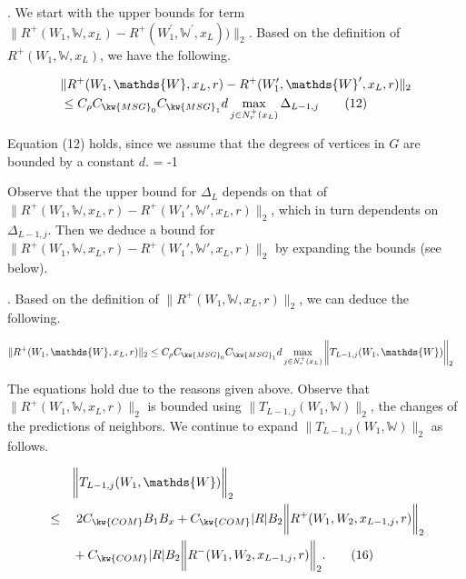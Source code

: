 \vspace{2ex}

.
We start with the upper bounds for term $\|R^+(W_{1},\mathds{W},x_{L})-R^+(W_{1}^{\prime},\mathds{W}^{\prime},x_{L}))\|_{2}$.
Based on the definition of 
$R^+(W_{1},\mathds{W},x_{L})$, we have the following.

\begin{scriptsize}	
\begin{align*}
&\|R^+(W_1,\mathds{W},x_L,r)-R^+(W_1',\mathds{W}',x_L,r)\|_2\\ %
  &\leq C_\rho C_{\kw{MSG}_0}C_{\kw{MSG}_1}d\max_{j\in N_r^+(x_L)}\Delta_{L-1,j}\tag{12}
\end{align*}
\end{scriptsize}

Equation (12) holds, since we assume that 
the degrees of vertices in $G$ are bounded by 
a constant $d$.
\looseness = -1

Observe that the upper bound for
$\Delta_{L}$ depends on that of $\|R^+(W_1,\mathds{W},x_L,r)-R^+(W_1',\mathds{W}',x_L,r)\|_2$,
which in turn dependents on $\Delta_{L-1,j}$.
Then we deduce a bound for $\|R^+(W_1,\mathds{W},x_L,r)-R^+(W_1',\mathds{W}',x_L,r)\|_2$
by expanding the bounds (see below). 


.
Based on the definition of $\|R^+(W_{1},\mathds{W},x_{L},r)\|_{2}$, 
we can deduce the following.

\begin{align*}
  \|R^+(W_{1},\mathds{W},x_{L},r)\|_{2} 
 & \leq C_\rho C_{\kw{MSG}_0}C_{\kw{MSG}_1}d\max_{j\in N_r^+(x_L)}\bigg\|T_{L-1,j}(W_1,\mathds{W})\bigg\|_2
\end{align*}


The equations hold due to the reasons given above.
Observe that $\|R^+(W_{1},\mathds{W},x_{L},r)\|_{2}$ 
is bounded using $\bigg\|T_{L-1,j}(W_1,\mathds{W})\bigg\|_2$,
\ie the changes of the predictions of neighbors.
We continue to expand $\bigg\|T_{L-1,j}(W_1,\mathds{W})\bigg\|_2$
as follows.

\vfill\null
\begin{align*}
    &\quad\quad\bigg\|T_{L-1,j}(W_1,\mathds{W})\bigg\|_2\\
    & \leq\quad 2C_{\kw{COM}}B_{1}B_{x}+C_{\kw{COM}}|R|B_{2}\bigg\|
    R^+(W_{1},W_{2},x_{L-1,j},r)\bigg\|_{2}\\
    &\quad\quad+C_{\kw{COM}}|R|B_{2}\bigg\|
    R^-(W_{1},W_{2},x_{L-1,j},r)\bigg\|_{2}.  \tag{16}
\end{align*}



